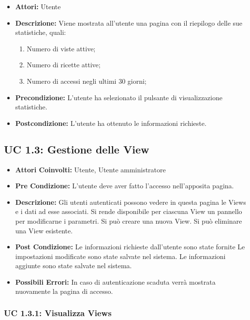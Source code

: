 \begin{itemize}
\item \textbf{Attori:} Utente
\item \textbf{Descrizione:} Viene mostrata all'utente una pagina con il riepilogo delle sue statistiche, quali:
\begin{enumerate}
\item Numero di viste attive;
\item Numero di ricette attive;
\item Numero di accessi negli ultimi 30 giorni;
\end{enumerate}
\item \textbf{Precondizione:} L'utente ha selezionato il pulsante di visualizzazione statistiche.
\item \textbf{Postcondizione:} L'utente ha ottenuto le informazioni richieste.
\end{itemize}



\subsection{UC 1.3: Gestione delle View}

\begin{itemize}
\item \textbf{Attori Coinvolti:} Utente, Utente amministratore
\item \textbf{Pre Condizione:} L’utente deve aver fatto l’accesso nell’apposita pagina.

\item \textbf{Descrizione:} Gli utenti autenticati possono vedere in questa pagina le Views e i dati ad esse associati. 
Si rende disponibile per ciascuna View un pannello per modificarne i parametri. 
Si può creare una nuova View. 
Si può eliminare una View esistente.

\item \textbf{Post Condizione:}
Le informazioni richieste dall'utente sono state fornite
Le impostazioni modificate sono state salvate nel sistema.
Le informazioni aggiunte sono state salvate nel sistema.

\item \textbf{Possibili Errori:}    
In caso di autenticazione scaduta verrà mostrata nuovamente la pagina di accesso.
\end{itemize}

\subsubsection{UC 1.3.1: Visualizza Views}

